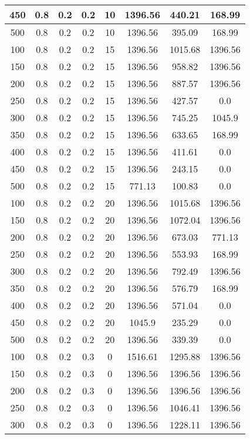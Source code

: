 \documentclass[a4paper, 12pt]{extreport}
\begin{document}
\begin{itemize}
\begin{longtable}{|c|c|c|c|c|c|c|c|}
			450 & 0.8 & 0.2 & 0.2 & 10 & 1396.56 & 440.21 & 168.99 \\\hline
			500 & 0.8 & 0.2 & 0.2 & 10 & 1396.56 & 395.09 & 168.99 \\\hline
			100 & 0.8 & 0.2 & 0.2 & 15 & 1396.56 & 1015.68 & 1396.56 \\\hline
			150 & 0.8 & 0.2 & 0.2 & 15 & 1396.56 & 958.82 & 1396.56 \\\hline
			200 & 0.8 & 0.2 & 0.2 & 15 & 1396.56 & 887.57 & 1396.56 \\\hline
			250 & 0.8 & 0.2 & 0.2 & 15 & 1396.56 & 427.57 & 0.0 \\\hline
			300 & 0.8 & 0.2 & 0.2 & 15 & 1396.56 & 745.25 & 1045.9 \\\hline
			350 & 0.8 & 0.2 & 0.2 & 15 & 1396.56 & 633.65 & 168.99 \\\hline
			400 & 0.8 & 0.2 & 0.2 & 15 & 1396.56 & 411.61 & 0.0 \\\hline
			450 & 0.8 & 0.2 & 0.2 & 15 & 1396.56 & 243.15 & 0.0 \\\hline
			500 & 0.8 & 0.2 & 0.2 & 15 & 771.13 & 100.83 & 0.0 \\\hline
			100 & 0.8 & 0.2 & 0.2 & 20 & 1396.56 & 1015.68 & 1396.56 \\\hline
			150 & 0.8 & 0.2 & 0.2 & 20 & 1396.56 & 1072.04 & 1396.56 \\\hline
			200 & 0.8 & 0.2 & 0.2 & 20 & 1396.56 & 673.03 & 771.13 \\\hline
			250 & 0.8 & 0.2 & 0.2 & 20 & 1396.56 & 553.93 & 168.99 \\\hline
			300 & 0.8 & 0.2 & 0.2 & 20 & 1396.56 & 792.49 & 1396.56 \\\hline
			350 & 0.8 & 0.2 & 0.2 & 20 & 1396.56 & 576.79 & 168.99 \\\hline
			400 & 0.8 & 0.2 & 0.2 & 20 & 1396.56 & 571.04 & 0.0 \\\hline
			450 & 0.8 & 0.2 & 0.2 & 20 & 1045.9 & 235.29 & 0.0 \\\hline
			500 & 0.8 & 0.2 & 0.2 & 20 & 1396.56 & 339.39 & 0.0 \\\hline
			100 & 0.8 & 0.2 & 0.3 & 0 & 1516.61 & 1295.88 & 1396.56 \\\hline
			150 & 0.8 & 0.2 & 0.3 & 0 & 1396.56 & 1396.56 & 1396.56 \\\hline
			200 & 0.8 & 0.2 & 0.3 & 0 & 1396.56 & 1396.56 & 1396.56 \\\hline
			250 & 0.8 & 0.2 & 0.3 & 0 & 1396.56 & 1046.41 & 1396.56 \\\hline
			300 & 0.8 & 0.2 & 0.3 & 0 & 1396.56 & 1228.11 & 1396.56 \\\hline

\end{longtable}
\end{itemize}
\end{document}

